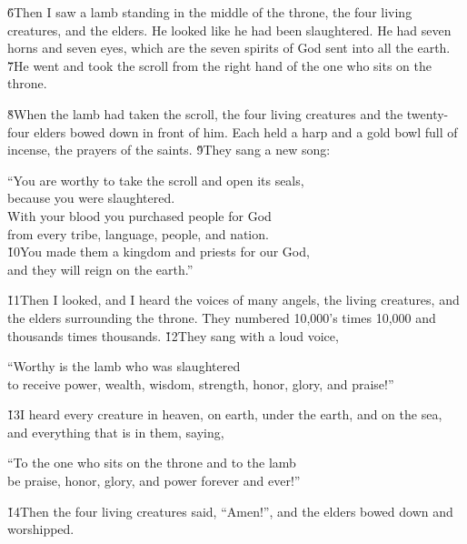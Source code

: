 \v{6}Then I saw a lamb standing in the middle of the throne, the four living creatures, and the elders. He looked like he had been slaughtered. He had seven horns and seven eyes, which are the seven spirits of God sent into all the earth. \v{7}He went and took the scroll from the right hand of the one who sits on the throne.

\v{8}When the lamb had taken the scroll, the four living creatures and the twenty-four elders bowed down in front of him. Each held a harp and a gold bowl full of incense, the prayers of the saints. \v{9}They sang a new song:

\begin{poetry}
\poeml ``You are worthy to take the scroll and open its seals, \\
\poemll    because you were slaughtered. \\
\poeml With your blood you purchased people for God \\
\poemll    from every tribe, language, people, and nation. \\
\poeml \v{10}You made them a kingdom and priests for our God, \\
\poemll    and they will reign on the earth.''
\end{poetry}

\v{11}Then I looked, and I heard the voices of many angels, the living creatures, and the elders surrounding the throne. They numbered 10,000's times 10,000 and thousands times thousands. \v{12}They sang with a loud voice,

\begin{poetry}
\poeml ``Worthy is the lamb who was slaughtered \\
\poemll    to receive power, wealth, wisdom, strength, honor, glory, and praise!''
\end{poetry}

\v{13}I heard every creature in heaven, on earth, under the earth, and on the sea, and everything that is in them, saying,

\begin{poetry}
\poeml ``To the one who sits on the throne and to the lamb \\
\poemll    be praise, honor, glory, and power forever and ever!''
\end{poetry}

\v{14}Then the four living creatures said, ``Amen!'', and the elders bowed down and worshipped.

